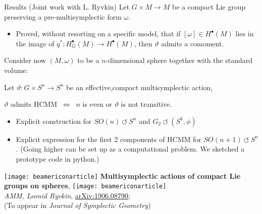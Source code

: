 \documentclass[handout,10pt]{beamer}
\begin{document}
\begin{frame}[fragile]{Results (Joint work with L. Ryvkin)}
	Let $G\times M\to M$ be a compact Lie group preserving a pre-multisymplectic form $\omega$.
	\begin{itemize}
		\item[\CheckedBox]  Proved, without resorting on a specific model, that if $[\omega]\in H^\bullet(M)$ lies in the image of $q^*:H^\bullet_G(M)\to H^\bullet(M)$, then $\vartheta$ admits a comoment.
	\end{itemize}
	\pause
	\vspace{1em}
	Consider now $(M,\omega)$ to be a $n$-dimensional sphere together with the standard volume:
			\begin{claimblock}
				Let $\vartheta:G\times S^n \to S^n$ be an effective,compact multisymplectic action,
				\begin{center}
					$\vartheta$ admits HCMM $~\Leftrightarrow~$ $n$ is even or $\vartheta$ is not transitive.
				\end{center}
			\end{claimblock}
	\begin{itemize}
		\item[\CheckedBox]  	Explicit construction for 
	$SO(n)~\circlearrowleft~S^{n}$ and
	$G_2~\circlearrowleft~(S^6,\phi)$
		\item[\CheckedBox]   Explicit expression for the first 2 components of HCMM for 
			$SO(n+1)~\circlearrowleft~S^{n}$.
		 (Going higher can be set up as a computational problem. We sketched a prototype code in python.)
		 	\end{itemize}

	\pause
	\begin{center}
		\texttt{[image: beamericonarticle]} 
		\textbf{Multisymplectic actions of compact Lie groups on spheres},
		\texttt{[image: beamericonarticle]} \\ 
		\emph{AMM, Leonid Ryvkin}, \href{https://arxiv.org/abs/1906.08790}{arXiv:1906.08790};\\
		(To appear in \emph{Journal of Symplectic Geometry})	
	\end{center}		


\end{frame}
\end{document}
